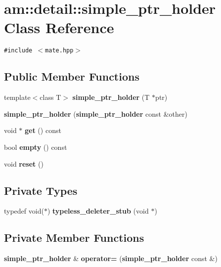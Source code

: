 \section{am::detail::simple\_\-ptr\_\-holder Class Reference}
\label{classam_1_1detail_1_1simple__ptr__holder}
{\tt \#include $<$mate.hpp$>$}

\subsection*{Public Member Functions}
\begin{CompactItemize}
\item 
template$<$class T$>$ \textbf{simple\_\-ptr\_\-holder} (T $\ast$ptr)\label{classam_1_1detail_1_1simple__ptr__holder_2f1481e35d91fe069c2e4b5ce1e62190}

\item 
\textbf{simple\_\-ptr\_\-holder} ({\bf simple\_\-ptr\_\-holder} const \&other)\label{classam_1_1detail_1_1simple__ptr__holder_42d5461ff01a8b5def157e79af43947d}

\item 
void $\ast$ \textbf{get} () const\label{classam_1_1detail_1_1simple__ptr__holder_7d87eeccfa11890cf7ffac424972205a}

\item 
bool \textbf{empty} () const\label{classam_1_1detail_1_1simple__ptr__holder_7cee3cc13012dc1b5d8f3c302533b3c5}

\item 
void \textbf{reset} ()\label{classam_1_1detail_1_1simple__ptr__holder_b8fd1365e058fba7c0270cc08d2f2599}

\end{CompactItemize}
\subsection*{Private Types}
\begin{CompactItemize}
\item 
typedef void($\ast$) \textbf{typeless\_\-deleter\_\-stub} (void $\ast$)\label{classam_1_1detail_1_1simple__ptr__holder_e0a1a8bbf6d7a1b4897df97eb3b5523f}

\end{CompactItemize}
\subsection*{Private Member Functions}
\begin{CompactItemize}
\item 
{\bf simple\_\-ptr\_\-holder} \& \textbf{operator=} ({\bf simple\_\-ptr\_\-holder} const \&)\label{classam_1_1detail_1_1simple__ptr__holder_b8a07a0e314e931f893ad3137a8cccbb}

\end{CompactItemize}
